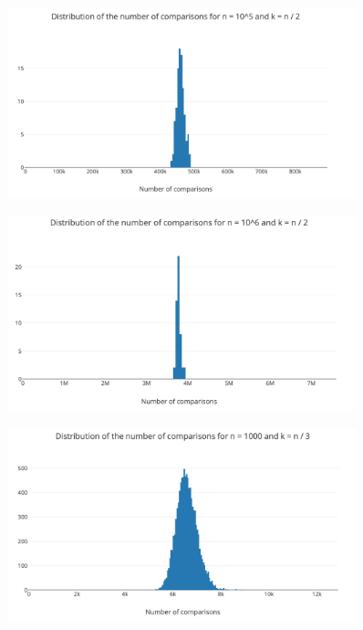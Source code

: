 \documentclass[12pt,a4paper]{article}
\begin{document}
\begin{figure}[ht!]
  \centering
  \includegraphics[width=0.9\textwidth]{img/n100000k50000.png}
  \caption{}
  \label{fig:}
\end{figure}

\begin{figure}[ht!]
  \centering
  \includegraphics[width=0.9\textwidth]{img/n1000000k500000.png}
  \caption{}
  \label{fig:}
\end{figure}

\begin{figure}[ht!]
  \centering
  \includegraphics[width=0.9\textwidth]{img/kdiv3.png}
  \caption{}
  \label{fig:div3}
\end{figure}
\end{document}
